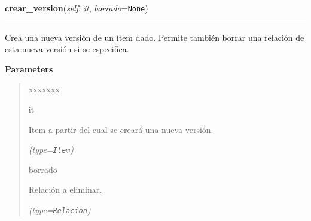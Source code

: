     \vspace{0.5ex}

\hspace{.8\funcindent}\begin{boxedminipage}{\funcwidth}

    \raggedright \textbf{crear\_version}(\textit{self}, \textit{it}, \textit{borrado}={\tt None})

    \vspace{-1.5ex}

    \rule{\textwidth}{0.5\fboxrule}
\setlength{\parskip}{2ex}
    Crea una nueva versión de un ítem dado. Permite también borrar una 
    relación de esta nueva versión si se especifica.

\setlength{\parskip}{1ex}
      \textbf{Parameters}
      \vspace{-1ex}

      \begin{quote}
        \begin{Ventry}{xxxxxxx}

          \item[it]

          Item a partir del cual se creará una nueva versión.

            {\it (type=\texttt{Item})}

          \item[borrado]

          Relación a eliminar.

            {\it (type=\texttt{Relacion})}

        \end{Ventry}

      \end{quote}

    \end{boxedminipage}

    \label{saip:controllers:item_controller:ItemController:crear_revision}

    \vspace{0.5ex}

